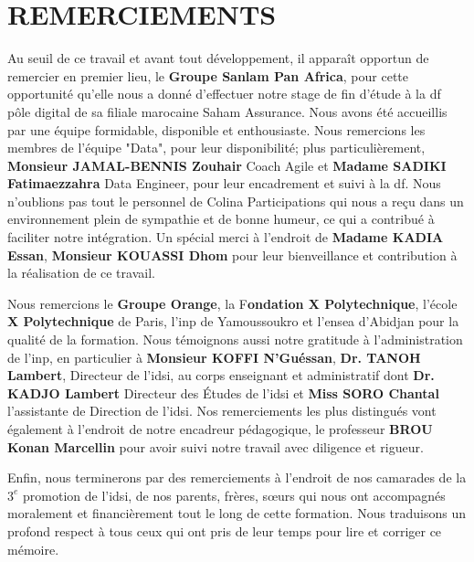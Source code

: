 \cleardoublepage
{}
{}
\chapter*{REMERCIEMENTS }

\begin{small}
Au seuil de ce travail et avant tout développement, il apparaît opportun de remercier en premier lieu, le \textbf{Groupe Sanlam Pan Africa}, pour cette opportunité qu’elle nous a donné d’effectuer notre stage de fin d'étude à la \acrfull{df} pôle digital de sa filiale marocaine Saham Assurance. Nous avons \'et\'e accueillis par une \'equipe formidable, disponible et enthousiaste. Nous remercions les membres de l’équipe "Data", pour leur disponibilité; plus particulièrement, \textbf{Monsieur JAMAL-BENNIS Zouhair} Coach Agile et \textbf{Madame SADIKI Fatimaezzahra} Data Engineer, pour leur encadrement et suivi \`a la \acrshort{df}. Nous n'oublions pas tout le personnel de Colina Participations qui nous a reçu dans un environnement plein de sympathie et de bonne humeur, ce qui a contribué à faciliter notre intégration. Un sp\'ecial merci \`a l'endroit de \textbf{Madame KADIA Essan}, \textbf{Monsieur KOUASSI Dhom} pour leur bienveillance et contribution \`a la r\'ealisation de ce travail.

Nous remercions le \textbf{Groupe Orange}, la F\textbf{ondation X Polytechnique}, l'école \textbf{X Polytechnique} de Paris, l'\acrfull{inp} de Yamoussoukro et l'\acrfull{ensea} d'Abidjan pour la qualit\'e de la formation. Nous témoignons aussi notre gratitude à l’administration de l’\acrshort{inp}, en particulier à \textbf{Monsieur KOFFI N’Guéssan}, \textbf{Dr. TANOH Lambert}, Directeur de l’\acrfull{idsi}, au corps enseignant et administratif dont \textbf{Dr. KADJO Lambert} Directeur des Études de l’\acrshort{idsi} et \textbf{Miss SORO Chantal} l'assistante de Direction de l'\acrshort{idsi}. Nos remerciements les plus distingués vont également à l'endroit de notre encadreur p\'edagogique, le professeur \textbf{BROU Konan Marcellin} pour avoir suivi notre travail avec diligence et rigueur.

Enfin, nous terminerons par des remerciements \`a l'endroit de nos camarades de la $ 3^{e} $  promotion de l'\acrshort{idsi}, de nos parents, frères, sœurs qui nous ont accompagnés moralement et financièrement tout le long de cette formation. Nous traduisons un profond respect à tous ceux qui ont pris de leur temps pour lire et corriger ce mémoire.
\end{small}
